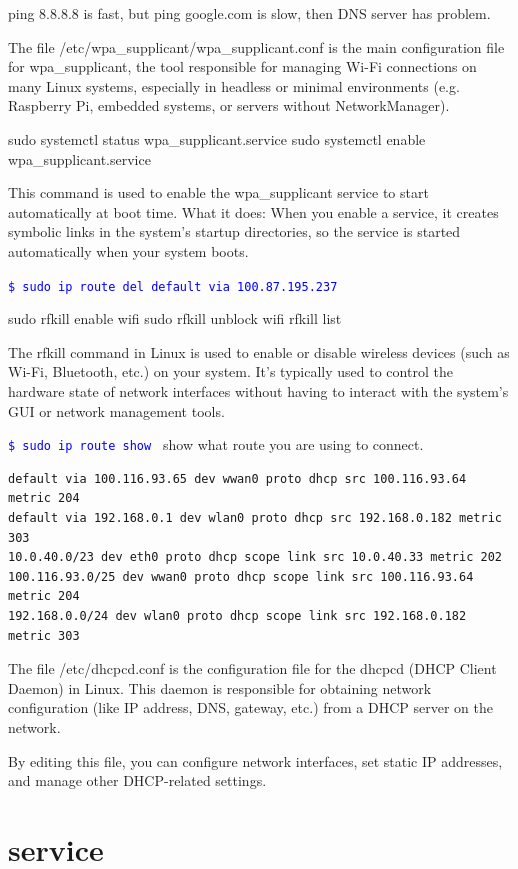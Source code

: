 \documentclass[paper=8.5in:11in, twoside, 12pt, pagesize=pdftex]{book}
\newcommand{\linuxcommand}[1]{\texttt{\textcolor{blue}{\$ #1 \Pisymbol{psy}{191}}}}
\begin{document}
ping 8.8.8.8 is fast, but ping google.com is slow, then DNS server has problem. 

The file /etc/wpa\_supplicant/wpa\_supplicant.conf is the main configuration file for wpa\_supplicant, the tool responsible for managing Wi-Fi connections on many Linux systems, especially in headless or minimal environments (e.g. Raspberry Pi, embedded systems, or servers without NetworkManager).

sudo systemctl status wpa\_supplicant.service
sudo systemctl enable wpa\_supplicant.service

This command is used to enable the wpa\_supplicant service to start automatically at boot time.
What it does: When you enable a service, it creates symbolic links in the system’s startup directories, so the service is started automatically when your system boots.


\linuxcommand{sudo ip route del default via 100.87.195.237}

sudo rfkill enable wifi
sudo rfkill unblock wifi
rfkill list

The rfkill command in Linux is used to enable or disable wireless devices (such as Wi-Fi, Bluetooth, etc.) on your system. It's typically used to control the hardware state of network interfaces without having to interact with the system's GUI or network management tools.


\linuxcommand{sudo ip route show} show what route you are using to connect. 
\begin{lstlisting}
default via 100.116.93.65 dev wwan0 proto dhcp src 100.116.93.64 metric 204
default via 192.168.0.1 dev wlan0 proto dhcp src 192.168.0.182 metric 303
10.0.40.0/23 dev eth0 proto dhcp scope link src 10.0.40.33 metric 202
100.116.93.0/25 dev wwan0 proto dhcp scope link src 100.116.93.64 metric 204
192.168.0.0/24 dev wlan0 proto dhcp scope link src 192.168.0.182 metric 303
\end{lstlisting}

The file /etc/dhcpcd.conf is the configuration file for the dhcpcd (DHCP Client Daemon) in Linux. This daemon is responsible for obtaining network configuration (like IP address, DNS, gateway, etc.) from a DHCP server on the network.

By editing this file, you can configure network interfaces, set static IP addresses, and manage other DHCP-related settings.

\section{service}
\end{document}
